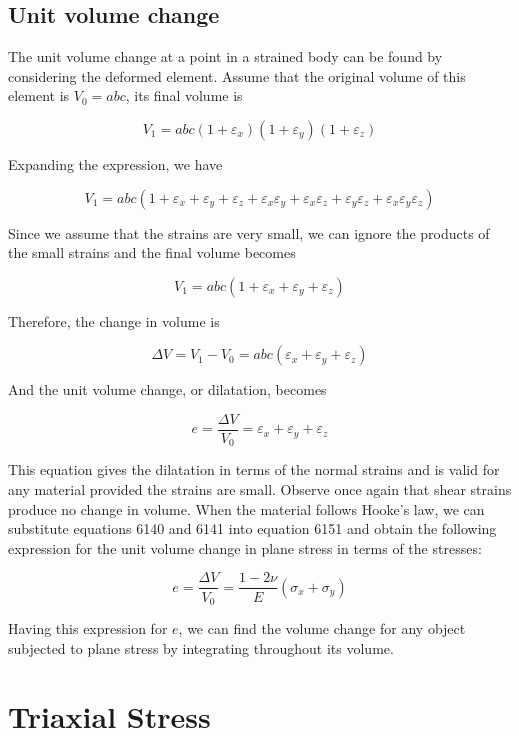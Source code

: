 \documentclass[
fontsize=10pt,
a4paper,
twosides=false,
open=any,
svgnames,
]{kaobook} %
\begin{document}
\subsection{Unit volume change}

The unit volume change at a point in a strained body can be found by considering the deformed element. Assume that the original volume of this element is $V_0 = abc$, its final volume is

\[V_1 = abc(1 + \varepsilon_x)(1 + \varepsilon_y)(1 + \varepsilon_z)\]

Expanding the expression, we have

\[V_1 = abc(1 + \varepsilon _x + \varepsilon _y + \varepsilon _z + \varepsilon_x\varepsilon_y + \varepsilon_x\varepsilon_z + \varepsilon_y\varepsilon_z + \varepsilon_x\varepsilon_y\varepsilon_z)\]

Since we assume that the strains are very small, we can ignore the products of the small strains and the final volume becomes

\[V_1 = abc(1 + \varepsilon_x + \varepsilon_y + \varepsilon_z)\]

Therefore, the change in volume is

\[\Delta V = V_1 - V_0 = abc(\varepsilon_x + \varepsilon_y + \varepsilon_z)\]

And the unit volume change, or dilatation, becomes

\begin{equation} \label{eqn: 2d dilatation}
  e = \frac{\Delta V}{V_0} = \varepsilon_x + \varepsilon_y + \varepsilon_z
\end{equation}

This equation gives the dilatation in terms of the normal strains and is valid for any material provided the strains are small. Observe once again that shear strains produce no change in volume. When the material follows Hooke’s law, we can substitute equations 6140 and 6141 into equation 6151 and obtain the following expression for the unit volume change in plane stress in terms of the stresses:

\begin{equation}
  e = \frac{\Delta V}{V_0} = \frac{1 - 2\nu}{E}(\sigma_x + \sigma_y)
\end{equation}
  
Having this expression for $e$, we can find the volume change for any object subjected to plane stress by integrating throughout its volume.

\section{Triaxial Stress}
\end{document}
